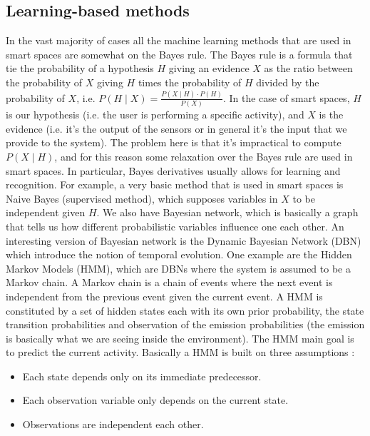 \documentclass[11pt]{article}
\begin{document}
\subsection{Learning-based methods}
In the vast majority of cases all the machine learning methods that are used in smart spaces are somewhat on the Bayes rule. The Bayes rule is a formula that tie the probability of a hypothesis $H$ giving an evidence $X$ as the ratio between the probability of $X$ giving $H$ times the probability of $H$ divided by the probability of $X$, i.e. $P(H \mid X) = \frac{P(X \mid H) \cdot P(H)}{P(X)}$. In the case of smart spaces, $H$ is our hypothesis (i.e. the user is performing a specific activity), and $X$ is the evidence (i.e. it's the output of the sensors or in general it's the input that we provide to the system). The problem here is that it's impractical to compute $P(X \mid H)$, and for this reason some relaxation over the Bayes rule are used in smart spaces. In particular, Bayes derivatives usually allows for learning and recognition. For example, a very basic method that is used in smart spaces is Naive Bayes (supervised method), which supposes variables in $X$ to be independent given $H$. We also have Bayesian network, which is basically a graph that tells us how different probabilistic variables influence one each other. An interesting version of Bayesian network is the Dynamic Bayesian Network (DBN) which introduce the notion of temporal evolution. One example are the Hidden Markov Models (HMM), which are DBNs where the system is assumed to be a Markov chain. A Markov chain is a chain of events where the next event is independent from the previous event given the current event. A HMM is constituted by a set of hidden states each with its own prior probability, the state transition probabilities and observation of the emission probabilities (the emission is basically what we are seeing inside the environment). The HMM main goal is to predict the current activity. Basically a HMM is built on three assumptions :

\begin{itemize}
\item Each state depends only on its immediate predecessor.
\item Each observation variable only depends on the current state.
\item Observations are independent each other.
\end{itemize}
\end{document}
